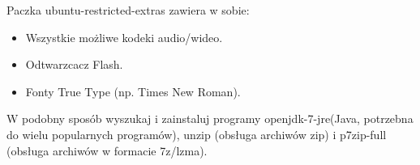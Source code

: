 Paczka \textcolor{ubuntu_orange}{ubuntu-restricted-extras} zawiera w sobie:
\begin{itemize}
\item Wszystkie możliwe kodeki audio/wideo.
\item Odtwarzcacz Flash.
\item Fonty True Type (np. Times New Roman).
\end{itemize}
W podobny sposób wyszukaj i zainstaluj programy \textcolor{ubuntu_orange}{openjdk-7-jre}(Java, potrzebna do wielu popularnych programów), \textcolor{ubuntu_orange}{unzip} (obsługa archiwów zip) i \textcolor{ubuntu_orange}{p7zip-full} (obsługa archiwów w formacie 7z/lzma).
\clearpage
